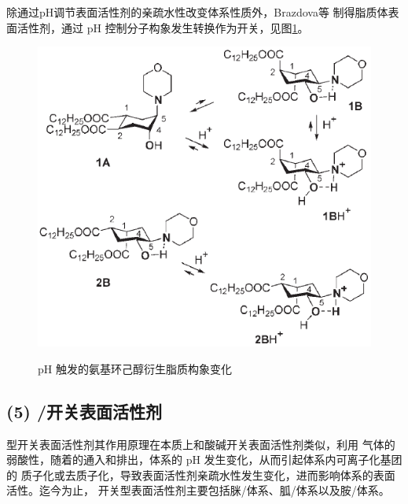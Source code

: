 \documentclass[bachelor,fandolfonts,replaceperiod]{jnuthesis}
\begin{document}
    除通过pH调节表面活性剂的亲疏水性改变体系性质外，Brazdova\cite{李云霞2011,brazdova2008}等
    制得脂质体表面活性剂，通过 pH 控制分子构象发生转换作为开关，见图\ref{fig:switchable-ph-conformation}。
    \begin{figure}[htbp]
        \centering
        \includegraphics[width=.55\textwidth]{figure/switchable-ph-conformation.png}\\
        \caption{pH 触发的氨基环己醇衍生脂质构象变化\cite{brazdova2008}}
        \label{fig:switchable-ph-conformation}
    \end{figure}

    \subsection*{(5) /开关表面活性剂}
    型开关表面活性剂其作用原理在本质上和酸碱开关表面活性剂类似，利用
    气体的弱酸性，随着的通入和排出，体系的 pH 发生变化，从而引起体系内可离子化基团的
    质子化或去质子化，导致表面活性剂亲疏水性发生变化，进而影响体系的表面活性。迄今为止，
    开关型表面活性剂主要包括脒/体系、胍/体系以及胺/体系\cite{梅平2016}。
    
\end{document}
